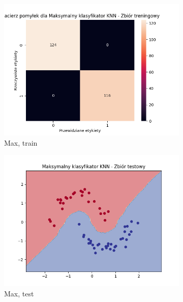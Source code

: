 \documentclass[12pt]{article}
\newcommand*{\subfigwidth}{0.24\textwidth}
\begin{document}
\begin{figure}[H]
\begin{subfigure}[t]{\subfigwidth}
        \includegraphics[width=\linewidth]{img/exp_2/knn/2_2/max/train_matrix.png}
        \caption{Max, train}
    \end{subfigure}
    \hfill
    \begin{subfigure}[t]{\subfigwidth}
        \includegraphics[width=\linewidth]{img/exp_2/knn/2_2/max/test_boundary.png}
        \caption{Max, test}
    \end{subfigure}
    \hfill
    \begin{subfigure}[t]{\subfigwidth}

\end{subfigure}
\end{figure}
\end{document}
